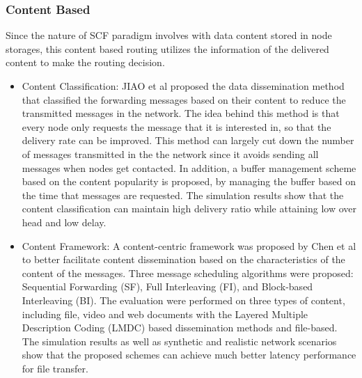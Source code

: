 \subsubsection{Content Based}
\label{bg:Opportunistic Networks:Classification of Opportunistic Routing:CTB}
Since the nature of SCF paradigm involves with data content stored in node storages, this content based routing utilizes the information of the delivered content to make the routing decision.
	\begin{itemize}
		\item Content Classification:
		JIAO et al \cite{Jiao2009} proposed the data dissemination method that classified the forwarding messages based on their content to reduce the transmitted messages in the network.
		The idea behind this method is that every node only requests the message that it is interested in, so that the delivery rate can be improved.
		This method can largely cut down the number of messages transmitted in the the network since it avoids sending all messages when nodes get contacted.
		In addition, a buffer management scheme based on the content popularity is proposed, by managing the buffer based on the time that messages are requested.
		The simulation results show that the content classification can maintain high delivery ratio while attaining low over head and low delay.

		\item Content Framework: 
		A content-centric framework was proposed by Chen et al \cite{Chen2008} to better facilitate content dissemination based on the characteristics of the content of the messages.
		Three message scheduling algorithms were proposed: Sequential Forwarding (SF), Full Interleaving (FI), and Block-based Interleaving (BI).
		The evaluation were performed on three types of content, including file, video and web documents with the Layered Multiple Description Coding (LMDC) based dissemination methods and file-based.
		The simulation results as well as synthetic and realistic network scenarios show that the proposed schemes can achieve much better latency performance for file transfer.

		
	\end{itemize}

